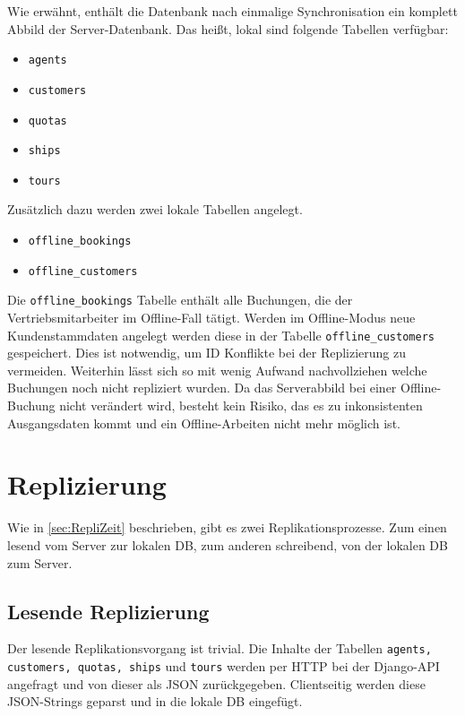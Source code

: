 \documentclass[12pt,a4paper,ngerman,english]{report}
\begin{document}
Wie erwähnt, enthält die Datenbank nach einmalige Synchronisation ein komplett Abbild der Server-Datenbank. Das heißt, lokal sind folgende Tabellen verfügbar:
\begin{itemize}
	\setlength\itemsep{0.1em}
	\item \texttt{agents}
	\item \texttt{customers}
	\item \texttt{quotas}
	\item \texttt{ships}
	\item \texttt{tours}
\end{itemize}
Zusätzlich dazu werden zwei lokale Tabellen angelegt.
\begin{itemize}
	\setlength\itemsep{0.1em}
	\item \texttt{offline\_bookings}
	\item \texttt{offline\_customers}
\end{itemize}
Die \texttt{offline\_bookings} Tabelle enthält alle Buchungen, die der Vertriebsmitarbeiter im Offline-Fall tätigt. Werden im Offline-Modus neue Kundenstammdaten angelegt werden diese in der Tabelle \texttt{offline\_customers} gespeichert. Dies ist notwendig, um ID Konflikte bei der Replizierung zu vermeiden. Weiterhin lässt sich so mit wenig Aufwand nachvollziehen welche Buchungen noch nicht repliziert wurden. Da das Serverabbild bei einer Offline-Buchung nicht verändert wird, besteht kein Risiko, das es zu inkonsistenten Ausgangsdaten kommt und ein Offline-Arbeiten nicht mehr möglich ist.

\section{Replizierung}
\label{sec:Replizierung}

Wie in \autoref{sec:RepliZeit} beschrieben, gibt es zwei Replikationsprozesse. Zum einen lesend vom Server zur lokalen DB, zum anderen schreibend, von der lokalen DB zum Server.

\subsection{Lesende Replizierung}

Der lesende Replikationsvorgang ist trivial. Die Inhalte der Tabellen \texttt{agents, customers, quotas, ships} und \texttt{tours} werden per HTTP bei der Django-API angefragt und von dieser als JSON zurückgegeben. Clientseitig werden diese JSON-Strings geparst und in die lokale DB eingefügt. 
\end{document}
